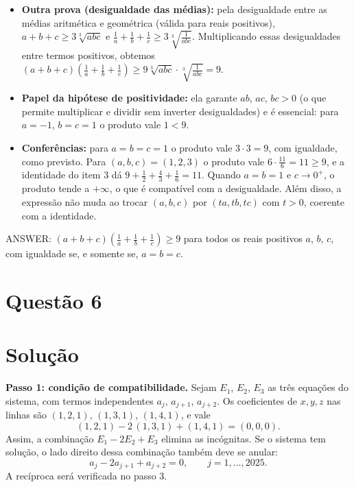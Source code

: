 \documentclass{article}%
\begin{document}
\begin{itemize}
\item \textbf{Outra prova (desigualdade das médias):} pela desigualdade entre as médias aritmética e geométrica (válida para reais positivos), $a+b+c\geq 3\sqrt[3]{abc}$ e $\frac{1}{a}+\frac{1}{b}+\frac{1}{c}\geq 3\sqrt[3]{\frac{1}{abc}}$. Multiplicando essas desigualdades entre termos positivos, obtemos $(a+b+c)\left(\frac{1}{a}+\frac{1}{b}+\frac{1}{c}\right)\geq 9\sqrt[3]{abc}\cdot\sqrt[3]{\frac{1}{abc}}=9$.
\item \textbf{Papel da hipótese de positividade:} ela garante $ab$, $ac$, $bc>0$ (o que permite multiplicar e dividir sem inverter desigualdades) e é essencial: para $a=-1$, $b=c=1$ o produto vale $1<9$.
\item \textbf{Conferências:} para $a=b=c=1$ o produto vale $3\cdot 3=9$, com igualdade, como previsto. Para $(a,b,c)=(1,2,3)$ o produto vale $6\cdot\frac{11}{6}=11\geq 9$, e a identidade do item 3 dá $9+\frac{1}{2}+\frac{4}{3}+\frac{1}{6}=11$. Quando $a=b=1$ e $c\to 0^+$, o produto tende a $+\infty$, o que é compatível com a desigualdade. Além disso, a expressão não muda ao trocar $(a,b,c)$ por $(ta,tb,tc)$ com $t>0$, coerente com a identidade.
\end{itemize}

ANSWER: $(a+b+c)\left(\frac{1}{a}+\frac{1}{b}+\frac{1}{c}\right)\geq 9$ para todos os reais positivos $a$, $b$, $c$, com igualdade se, e somente se, $a=b=c$.%
\newpage%
\section*{Questão 6}

\section*{Solução}

\textbf{Passo 1: condição de compatibilidade.} Sejam $E_1$, $E_2$, $E_3$ as três equações do sistema, com termos independentes $a_j$, $a_{j+1}$, $a_{j+2}$. Os coeficientes de $x,y,z$ nas linhas são $(1,2,1)$, $(1,3,1)$, $(1,4,1)$, e vale
\[
(1,2,1)-2\,(1,3,1)+(1,4,1)=(0,0,0).
\]
Assim, a combinação $E_1-2E_2+E_3$ elimina as incógnitas. Se o sistema tem solução, o lado direito dessa combinação também deve se anular:
\begin{equation}\label{cond}
a_j-2a_{j+1}+a_{j+2}=0, \qquad j=1,\ldots,2025.
\end{equation}
A recíproca será verificada no passo 3.
\end{document}
